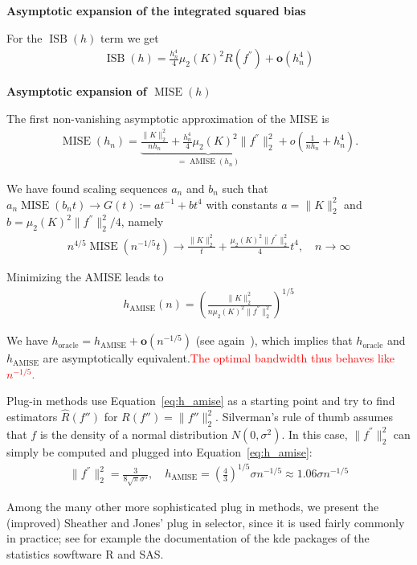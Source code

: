 \textbf{Asymptotic expansion of the integrated squared bias}

For the $\operatorname{ISB}(h)$ term we get
\begin{align*}
    \operatorname{ISB}(h)=\frac{h_n^4}{4}\mu_2(K)^2R(f^{''})+\mathbf{o}(h_n^4)
\end{align*}

\textbf{Asymptotic expansion of $\operatorname{MISE}(h)$}

The first non-vanishing asymptotic approximation of the MISE is
\begin{align*}
    \operatorname{MISE}(h_n)=\underbrace{\frac{\|K\|_2^2}{nh_n}+\frac{h_n^4}{4}\mu_2(K)^2\|f^{''}\|_2^2}_{=\operatorname{AMISE}(h_n)}+o\left(\frac{1}{nh_n}+h_n^{4}\right).
\end{align*}

We have found scaling sequences $a_n$ and $b_n$ such that $a_n\operatorname{MISE}(b_nt)\to G(t):=at^{-1}+bt^4$ with constants $a=\|K\|_2^2$ and $b=\mu_2(K)^2\|f^{''}\|_2^2/4$, namely
\begin{align*}
    n^{4/5}\operatorname{MISE}(n^{-1/5}t)\to\frac{\|K\|_2^2}{t}+\frac{\mu_2(K)^2\|f^{''}\|_2^2}{4}t^4,\quad n\to\infty
\end{align*}

Minimizing the AMISE leads to
\begin{align}\label{eq:h_amise}
    h_{\operatorname{AMISE}}(n)=\left(\frac{\|K\|_2^2}{n\mu_2(K)^2\|f^{''}\|_2^2}\right)^{1/5}
\end{align}

We have $h_{\text{oracle}}=h_{\operatorname{AMISE}}+\mathbf{o}(n^{-1/5})$ (see again~\cite{chacon_existence_nodate}), which implies that $h_{\text{oracle}}$ and $h_{\operatorname{AMISE}}$ are asymptotically equivalent.\textcolor{red}{The optimal bandwidth thus behaves like $n^{-1/5}$.}

Plug-in methods use Equation~\eqref{eq:h_amise} as a starting point and try to find estimators $\hat{R}(f'')$ for $R(f'')=\|f''\|_2^2$. Silverman's rule of thumb assumes that $f$ is the density of a normal distribution $N(0,\sigma^2)$. In this case, $\|f^{''}\|_2^2$ can simply be computed and plugged into Equation~\eqref{eq:h_amise}:
\begin{align*}
    \|f^{''}\|_2^2=\frac{3}{8\sqrt{\pi}\sigma^{5}},\quad h_{\operatorname{AMISE}}=\left(\frac{4}{3}\right)^{1/5}\sigma n^{-1/5}\approx1.06\sigma n^{-1/5}
\end{align*}

Among the many other more sophisticated plug in methods, we present the (improved) Sheather and Jones' plug in selector, since it is used fairly commonly in practice; see for example the documentation of the kde packages of the statistics sowftware R and SAS.

